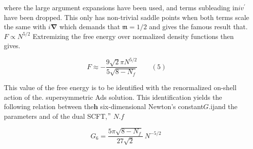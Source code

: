 \documentclass{article}
\begin{document}
where the large argument expansions have been used, and terms subleading in$i v ^ { \prime }$have been
dropped. This only has non-trivial saddle points when both terms scale the same with $i \mathbf { \nabla }$
which demands that $\mathfrak { m } = 1 / 2$ and gives the famous result that. $F \propto N ^ { 5 / 2 }$ Extremizing the
free energy over normalized density functions then gives.


\begin{equation}
F \approx - \frac { 9 \sqrt { 2 } \pi N ^ { 5 / 2 } } { 5 \sqrt { 8 - N _ { f } } } \qquad ( 5 )
\end{equation}


This value of the free energy is to be identified with the renormalized on-shell action of the.
supersymmetric Ads solution. This identification yields the following relation between the$\mathbf { h }$
six-dimensional Newton's constant$G . { \mathrm { i j } }$and the parameters and of the dual SCFT,$"$ $N . { f }$


\begin{equation}
G _ { 6 } = \frac { 5 \pi \sqrt { 8 - N _ { f } } } { 2 7 \sqrt { 2 } } ~ N ^ { - 5 / 2 } ~
\end{equation}
\end{document}
